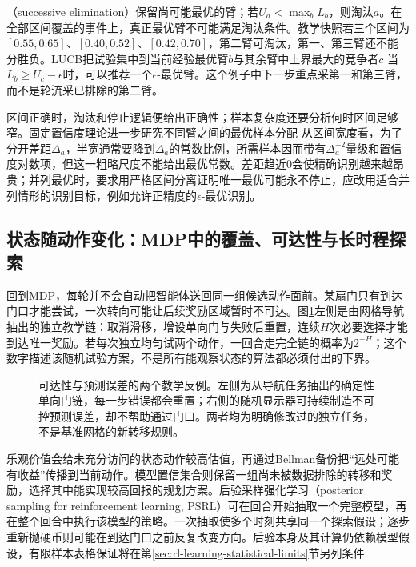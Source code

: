（successive elimination）保留尚可能最优的臂；若$U_a<\max_b L_b$，则淘汰$a$。在全部区间覆盖的事件上，真正最优臂不可能满足淘汰条件。教学快照若三个区间为$[0.55,0.65]$、$[0.40,0.52]$、$[0.42,0.70]$，第二臂可淘汰，第一、第三臂还不能分胜负。LUCB把试验集中到当前经验最优臂$b$与其余臂中上界最大的竞争者$c$
当$L_b\geq U_c-\epsilon$时，可以推荐一个$\epsilon$-最优臂。这个例子中下一步重点采第一和第三臂，而不是轮流采已排除的第二臂。

区间正确时，淘汰和停止逻辑便给出正确性；样本复杂度还要分析何时区间足够窄。固定置信度理论进一步研究不同臂之间的最优样本分配
从区间宽度看，为了分开差距$\Delta_a$，半宽通常要降到$\Delta_a$的常数比例，所需样本因而带有$\Delta_a^{-2}$量级和置信度对数项，但这一粗略尺度不能给出最优常数。差距趋近0会使精确识别越来越昂贵；并列最优时，要求用严格区间分离证明唯一最优可能永不停止，应改用适合并列情形的识别目标，例如允许正精度的$\epsilon$-最优识别。

\subsection{状态随动作变化：MDP中的覆盖、可达性与长时程探索}
\label{sec:rl-learning-deep-exploration}

回到MDP，每轮并不会自动把智能体送回同一组候选动作面前。某扇门只有到达门口才能尝试，一次转向可能让后续奖励区域暂时不可达。图\ref{fig:rl-learning-exploration-chain}左侧是由网格导航抽出的独立教学链：取消滑移，增设单向门与失败后重置，连续$H$次必要选择才能到达唯一奖励。若每次独立均匀试两个动作，一回合走完全链的概率为$2^{-H}$；这个数字描述该随机试验方案，不是所有能观察状态的算法都必须付出的下界。

\begin{figure}[t]
  \centering
  
  \caption{可达性与预测误差的两个教学反例。左侧为从导航任务抽出的确定性单向门链，每一步错误都会重置；右侧的随机显示器可持续制造不可控预测误差，却不帮助通过门口。两者均为明确修改过的独立任务，不是基准网格的新转移规则。}
  \label{fig:rl-learning-exploration-chain}
\end{figure}

乐观价值会给未充分访问的状态动作较高估值，再通过Bellman备份把“远处可能有收益”传播到当前动作。模型置信集合则保留一组尚未被数据排除的转移和奖励，选择其中能实现较高回报的规划方案。后验采样强化学习（posterior sampling for reinforcement learning, PSRL）可在回合开始抽取一个完整模型，再在整个回合中执行该模型的策略。一次抽取使多个时刻共享同一个探索假设；逐步重新抛硬币则可能在到达门口之前反复改变方向。后验本身及其计算仍依赖模型假设，有限样本表格保证将在第\ref{sec:rl-learning-statistical-limits}节另列条件

